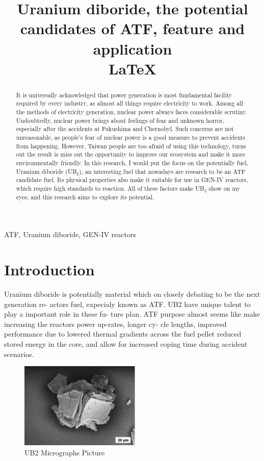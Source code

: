\documentclass[final,10pt,times,twocolumn]{elsarticle}
\begin{document}
\begin{frontmatter}
\title{Uranium diboride, the potential candidates of ATF, feature and application \\ \LaTeX}
\begin{abstract}
It is universally acknowledged that power generation is most fundamental facility required by every industry, as almost all things require electricity to work. Among all the methods of electricity generation, nuclear power always faces considerable scrutiny. Undoubtedly, nuclear power brings about feelings of fear and unknown horror, especially after the accidents at Fukushima and Chernobyl. Such concerns are not unreasonable, as people's fear of nuclear power is a good measure to prevent accidents from happening. However, Taiwan people are too afraid of using this technology, turns out the result is miss out the opportunity to improve our ecosystem and make it more environmentally friendly. In this research, I would put the focus on the potentially fuel, Uranium diboride (UB$_{2}$), an interesting fuel that nowadays are research to be an ATF candidate fuel. Its physical properties also make it suitable for use in GEN-IV reactors, which require high standards to reaction. All of these factors make UB$_{2}$ show on my eyes, and this research aims to explore its potential.
\end{abstract}

\begin{keyword}
ATF, Uranium diboride, GEN-IV reactors
\end{keyword}

\end{frontmatter}

\section{Introduction}
Uranium diboride is potentially material which
on closely debating to be the next generation re-
actors fuel, expecialy known as ATF. UB2 have
unique talent to play a important role in these fu-
ture plan. ATF purpose almost seems like make
increasing the reactors power up-rates, longer cy-
cle lengths, improved performance due to lowered
thermal gradients across the fuel pellet reduced
stored energy in the core, and allow for increased
coping time during accident scenarios.

\begin{figure}[ht]
    \centering
    \includegraphics[width = 5.75cm]{UB2 Micrographs.png}
    \caption{UB2 Micrographs Picture\cite{watkins2022challenges} }
\end{figure}
\end{document}
